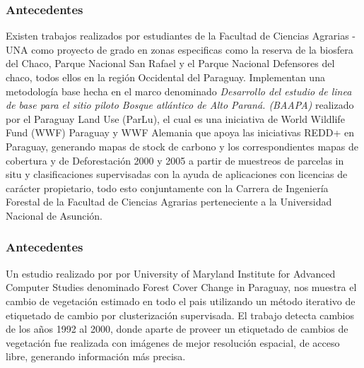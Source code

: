 \documentclass[xcolor=table]{beamer}
\begin{document}
\begin{frame}
	\frametitle{Antecedentes}

	Existen trabajos realizados por estudiantes de la Facultad de Ciencias Agrarias - UNA como proyecto de grado en zonas especificas como la reserva de la biosfera del Chaco, Parque Nacional San Rafael y el Parque Nacional Defensores del chaco, todos ellos en la regi\'on Occidental del Paraguay. Implementan una metodolog\'ia base hecha en el marco denominado \textit{Desarrollo del estudio de linea de base para el sitio piloto Bosque atl\'antico de Alto Paran\'a. (BAAPA)} realizado por el Paraguay Land Use (ParLu), el cual es una iniciativa de World Wildlife Fund (WWF)	Paraguay y WWF Alemania que apoya las iniciativas REDD+ en Paraguay, generando mapas de stock de carbono y los correspondientes mapas de cobertura y de Deforestaci\'on 2000 y 2005 a partir de muestreos de parcelas in situ y clasificaciones supervisadas con la ayuda de aplicaciones con licencias de car\'acter propietario, todo esto conjuntamente con la  Carrera de Ingenier\'ia Forestal de la Facultad de Ciencias Agrarias perteneciente a la Universidad Nacional de Asunci\'on.
	
	
\end{frame}



\begin{frame}
	\frametitle{Antecedentes}
	
Un estudio realizado por por University of Maryland Institute for Advanced Computer Studies denominado Forest Cover Change in Paraguay, nos muestra el cambio de vegetaci\'on estimado en todo el pais utilizando un m\'etodo iterativo de etiquetado de cambio por clusterizaci\'on supervisada. El trabajo detecta cambios de los a\~{n}os 1992 al 2000, donde aparte de proveer un etiquetado de cambios de vegetaci\'on fue realizada con im\'agenes de mejor resoluci\'on espacial, de acceso libre, generando informaci\'on m\'as precisa.
	
\end{frame}
\end{document}
